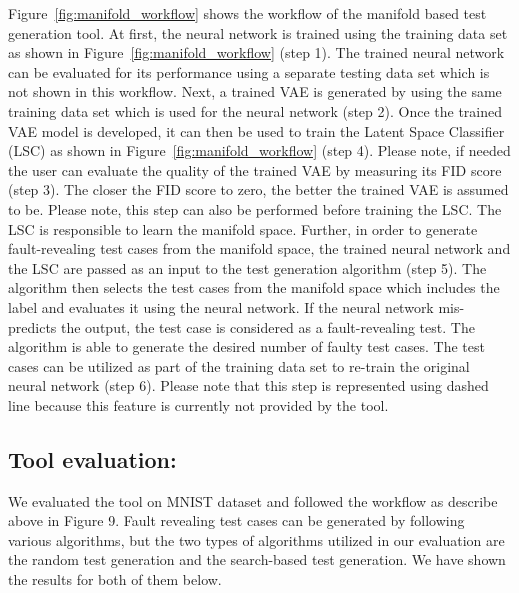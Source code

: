 Figure~\ref{fig:manifold_workflow} shows the workflow of the manifold based test generation tool. At first, the neural network is trained using the training data set as shown in Figure~\ref{fig:manifold_workflow} (step 1). The trained neural network can be evaluated for its performance using a separate testing data set which is not shown in this workflow. Next, a trained VAE is generated by using the same training data set which is used for the neural network (step 2). Once the trained VAE model is developed, it can then be used to train the Latent Space Classifier (LSC) as shown in Figure~\ref{fig:manifold_workflow} (step 4). Please note, if needed the user can evaluate the quality of the trained VAE by measuring its FID score (step 3). The closer the FID score to zero, the better the trained VAE is assumed to be. Please note, this step can also be performed before training the LSC. The LSC is responsible to learn the manifold space. Further, in order to generate fault-revealing test cases from the manifold space, the trained neural network and the LSC are passed as an input to the test generation algorithm (step 5). The algorithm then selects the test cases from the manifold space which includes the label and evaluates it using the neural network. If the neural network mis-predicts the output, the test case is considered as a fault-revealing test. The algorithm is able to generate the desired number of faulty test cases. The test cases can be utilized as part of the training data set to re-train the original neural network (step 6). Please note that this step is represented using dashed line because this feature is currently not provided by the tool.

\subsection{Tool evaluation:} We evaluated the tool on MNIST dataset and followed the workflow as describe above in Figure 9. Fault revealing test cases can be generated by following various algorithms, but the two types of algorithms utilized in our evaluation are the random test generation and the search-based test generation. We have shown the results for both of them below. 

